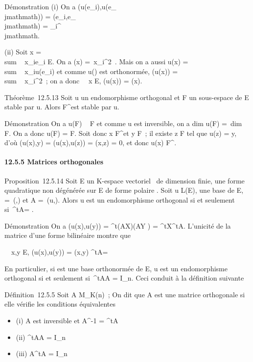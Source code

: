 \documentclass[]{article}
\begin{document}
Démonstration (i) On a \phi(u(e_i),u(e_\\jmathmath)) =
\phi(e_i,e_\\jmathmath) = \delta_i^\\jmathmath.

(ii) Soit x = \\sum ~
x_ie_i \in E. On a \Phi(x) =\
\sum  x_i^2~. Mais on a aussi
u(x) = \\sum ~
x_iu(e_i) et comme u() est orthonormée, \Phi(u(x))
= \\sum ~
x_i^2~; on a donc \forall~~x \in E,
\Phi(u(x)) = \Phi(x).

Théorème~12.5.13 Soit u un endomorphisme orthogonal et F un sous-espace
de E stable par u. Alors F^\bot est stable par u.

Démonstration On a u(F) \subset~ F et comme u est inversible, on a
dim u(F) =\ dim~ F. On
a donc u(F) = F. Soit donc x \in F^\bot et y \in F~; il existe z \in F
tel que u(z) = y, d'où \phi(u(x),y) = \phi(u(x),u(z)) = \phi(x,z) = 0, et donc
u(x) \in F^\bot.

\paragraph{12.5.5 Matrices orthogonales}

Proposition~12.5.14 Soit E un K-espace vectoriel ~de dimension finie, \Phi
une forme quadratique non dégénérée sur E de forme polaire \phi. Soit u \in
L(E),  une base de E, \Omega =\
\mathrmMat (\phi,) et A =\
\mathrmMat (u,\mathcal{E}). Alors u est un endomorphisme
orthogonal si et seulement si~^tA\OmegaA = \Omega.

Démonstration On a \phi(u(x),u(y)) = ^t(AX)\Omega(AY ) =
^tX^tA\OmegaAY . L'unicité de la matrice d'une forme
bilinéaire montre que

\forall~~x,y \in E, \phi(u(x),u(y)) = \phi(x,y)
\Leftrightarrow ^tA\OmegaA = \Omega

En particulier, si \mathcal{E} est une base orthonormée de E, u est un
endomorphisme orthogonal si et seulement si~^tAA =
I_n. Ceci conduit à la définition suivante

Définition~12.5.5 Soit A \in M_K(n)~; On dit que A est une
matrice orthogonale si elle vérifie les conditions équivalentes

\begin{itemize}
\itemsep1pt\parskip0pt\parsep0pt
\item
  (i) A est inversible et A^-1 = ^tA
\item
  (ii) ^tAA = I_n
\item
  (iii) A^tA = I_n
\end{itemize}
\end{document}
